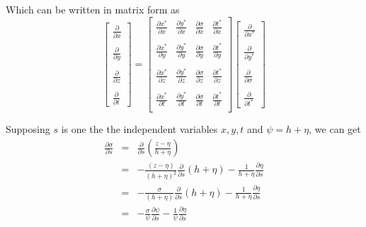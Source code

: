 \documentclass[oribibl]{llncs}
\begin{document}
Which can be written in matrix form as
\begin{equation}      
\left[                 
  \begin{array}{c}  
    \frac{\partial}{\partial x}  \\  \nonumber \\ 
    \frac{\partial}{\partial y}  \\ \nonumber \\ 
    \frac{\partial}{\partial z}  \\ \nonumber \\ 
    \frac{\partial}{\partial t} 
  \end{array}
\right]
=  
\left[             
  \begin{array}{cccc}  
    \frac{\partial x^*}{\partial x} & \frac{\partial y^*}{\partial x} & \frac{\partial \sigma}{\partial x} & \frac{\partial t^*}{\partial x}\\   \nonumber \\ 
    \frac{\partial x^*}{\partial y} & \frac{\partial y^*}{\partial y} & \frac{\partial \sigma}{\partial y} & \frac{\partial t^*}{\partial y}\\   \nonumber \\ 
    \frac{\partial x^*}{\partial z} & \frac{\partial y^*}{\partial z} & \frac{\partial \sigma}{\partial z} & \frac{\partial t^*}{\partial z}\\   \nonumber \\ 
    \frac{\partial x^*}{\partial t} & \frac{\partial y^*}{\partial t} & \frac{\partial \sigma}{\partial t} & \frac{\partial t^*}{\partial t}\\  
  \end{array}
\right]              
\left[                 
  \begin{array}{c}  
    \frac{\partial}{\partial x^*}  \\  \nonumber \\ 
    \frac{\partial}{\partial y^*}  \\ \nonumber \\ 
    \frac{\partial}{\partial \sigma}  \\ \nonumber \\ 
    \frac{\partial}{\partial t^*} 
  \end{array}
\right]
\end{equation}

Supposing $s$ is one the the independent variables $x,y,t$ and $\psi=h+\eta$, we can get
\begin{eqnarray}
\frac{\partial \sigma}{\partial s} &=& \frac{\partial }{\partial s}\left( \frac{z-\eta}{h+\eta} \right)  \nonumber\\
&=& -\frac{(z-\eta)}{(h+\eta)^2 }\frac{\partial}{\partial s}(h+\eta) - \frac{1}{h+\eta}\frac{\partial \eta}{\partial s} \nonumber\\
&=& -\frac{\sigma}{(h+\eta)}\frac{\partial}{\partial s}(h+\eta) - \frac{1}{h+\eta}\frac{\partial \eta}{\partial s} \nonumber\\
&=& -\frac{\sigma}{\psi}\frac{\partial \psi}{\partial s} - \frac{1}{\psi}\frac{\partial \eta}{\partial s}
\end{eqnarray}
\end{document}
